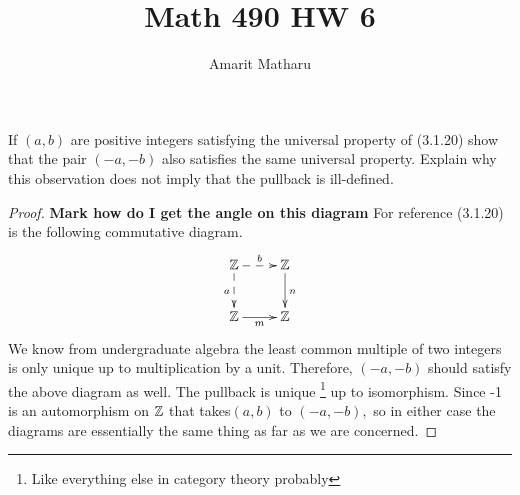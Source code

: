 \documentclass{article}
\title{Math 490 HW 6}
\author{Amarit Matharu}
\begin{document}
\maketitle

\begin{exercise}
	If $ (a,b) $ are positive integers satisfying the universal property of 
	(3.1.20) show that the pair $ (-a,-b) $ also satisfies the same universal 
	property. Explain why this observation does not imply that the pullback is 
	ill-defined.
\end{exercise}
\begin{proof}
	\textbf{Mark how do I get the angle on this diagram}
	For reference (3.1.20) is the following commutative diagram.
$$	\xymatrix{\ZZ\ar@{-->}[r]^b\ar@{-->}[d]_a&\ZZ\ar[d]^n\\\ZZ\ar[r]_m&\ZZ
	}
$$
We know from undergraduate algebra the least common multiple of two integers is 
only unique up to multiplication by a unit. Therefore, $ (-a,-b) $ should 
satisfy the above diagram as well.
The pullback is unique \footnote{Like everything else in category theory 
probably} up to isomorphism. Since -1 is an automorphism on $ \mathbb{Z} $ that takes$ 
 (a,b)$ to $ (-a,-b), $  so in either case the diagrams are essentially the
 same thing as far as we are concerned. 

\end{proof}
\end{document}
